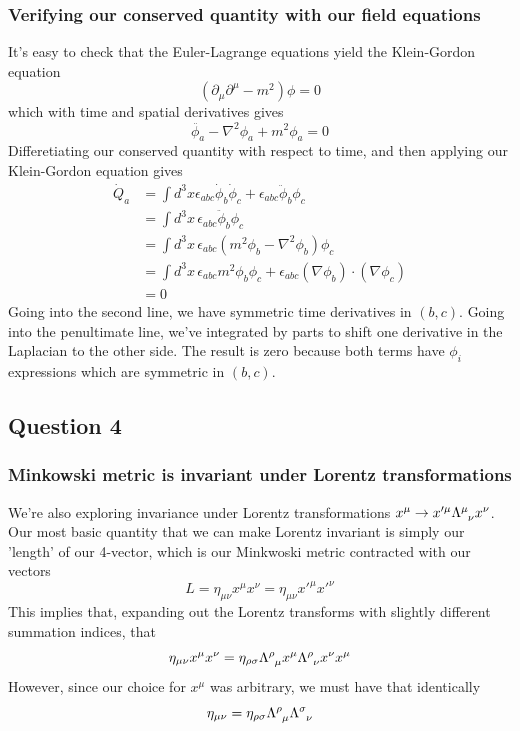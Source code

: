 \documentclass[11pt, oneside]{article}   	%
\theoremstyle{newline}
\theoremstyle{newline}
\theoremstyle{newline}
\theoremstyle{newline}
\theoremstyle{newline}
\begin{document}
\subsubsection*{Verifying our conserved quantity with our field equations} 
It's easy to check that the Euler-Lagrange equations yield the Klein-Gordon equation \[(\partial_\mu \partial^\mu  - m^2 ) \phi = 0 \] which with time and spatial derivatives gives 
\[ \ddot{ \phi_a}  - \nabla^2 \phi_a  + m^2 \phi_a  = 0 \] 
Differetiating our conserved quantity with respect to time, and then applying our Klein-Gordon equation gives 
\begin{align*} 
\dot{Q }_a & = \int d^3 x \epsilon_{ abc } \dot{ \phi}_b \dot{ \phi}_c + \epsilon_{ abc} \ddot{ \phi }_b \phi_c   \\ 
& = \int d^3 x \, \epsilon_{ abc} \ddot{ \phi}_b \phi_c \\
&= \int d^3x  \, \epsilon_{ abc} ( m^2 \phi_b   - \nabla^2 \phi_b ) \phi_c \\
&= \int d^3 x \, \epsilon_{abc} m^2 \phi_b \phi_c + \epsilon_{abc} ( \nabla \phi_b) \cdot ( \nabla \phi_c ) \\
&= 0 
\end{align*} 
Going into the second line, we have symmetric time derivatives in $( b, c)$. Going into the penultimate line, we've integrated by parts to shift one derivative in the Laplacian to the other side. The result is zero because both terms have $\phi_i $ expressions which are symmetric in $( b, c) $. 

\pagebreak 
\subsection{Question 4} 


\subsubsection*{Minkowski metric is invariant under Lorentz transformations} 
We're also exploring invariance under Lorentz transformations $x^\mu \rightarrow x'^\mu \Lambda\indices{^\mu_\nu}x^\nu$. Our most basic quantity that we can make Lorentz invariant is simply our 'length' of our 4-vector, which is our Minkwoski metric contracted with our vectors 
\[ 
L = \eta_{ \mu \nu} x^\mu x^\nu = \eta_{\mu \nu} x'^\mu x'^\nu 
\]
This implies that, expanding out the Lorentz transforms with slightly different summation indices, that 
\[ 
\eta_{ \mu \nu} x^\mu x^\nu  = \eta_{\rho \sigma} \Lambda \indices{^\rho_\mu} x^\mu \Lambda\indices{^\rho_\nu}x^\nu x^\mu  \] 
However, since our choice for $x^\mu$ was arbitrary, we must have that identically 
\[ 
\eta_{ \mu \nu}  = \eta_{\rho \sigma} \Lambda\indices{^\rho_\mu} \Lambda\indices{^\sigma_\nu} 
\]  
\end{document}
